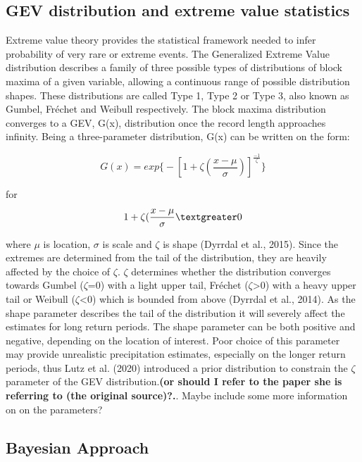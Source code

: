 \subsection{GEV distribution and extreme value statistics}

Extreme value theory provides the statistical framework needed to infer probability of very rare or extreme events. The Generalized Extreme Value distribution describes a family of three possible types of distributions of block maxima of a given variable, allowing a continuous range of possible distribution shapes. These distributions are called Type 1, Type 2 or Type 3, also known as Gumbel, Fréchet and Weibull respectively. The block maxima distribution converges to a GEV, G(x), distribution once the record length approaches infinity. Being a three-parameter distribution, G(x) can be written on the form:

\begin{equation}
	G(x) = exp\bigg\{-\left[1+\zeta(\frac{x-\mu}{\sigma})\right]^\frac{-1}{\zeta}\bigg\}
	\label{eq:gev}
\end{equation}

for 
\begin{equation}
	1+\zeta(\frac{x-\mu}{\sigma} \textgreater 0
\end{equation}

where $\mu$ is location, $\sigma$ is scale and $\zeta$ is shape (Dyrrdal et al., 2015). Since the extremes are determined from the tail of the distribution, they are heavily affected by the choice of $\zeta$. $\zeta$ determines whether the distribution converges towards Gumbel ($\zeta$=0) with a light upper tail, Fréchet ($\zeta$\textgreater0) with a heavy upper tail or Weibull ($\zeta$\textless0) which is bounded from above (Dyrrdal et al., 2014). As the shape parameter describes the tail of the distribution it will severely affect the estimates for long return periods. The shape parameter can be both positive and negative, depending on the location of interest. Poor choice of this parameter may provide unrealistic precipitation estimates, especially on the longer return periods, thus Lutz et al. (2020) introduced a prior distribution to constrain the $\zeta$ parameter of the GEV distribution.\textbf{(or should I refer to the paper she is referring to (the original source)?.}. Maybe include some more information on on the parameters? 

\subsection{Bayesian Approach}
